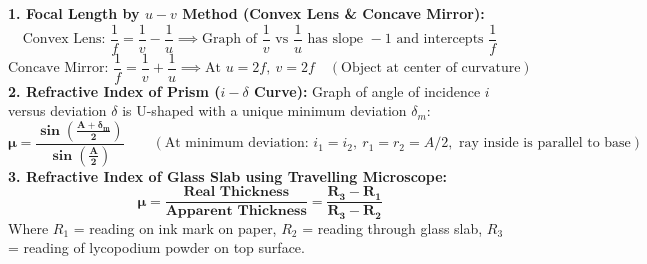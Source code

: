 \documentclass[10pt,a4paper]{article}
\begin{document}
\begin{formulabox}
\textbf{1. Focal Length by $u-v$ Method (Convex Lens \& Concave Mirror):}
\begin{equation}
  \text{Convex Lens: } \frac{1}{f} = \frac{1}{v} - \frac{1}{u} \implies \text{Graph of } \frac{1}{v} \text{ vs } \frac{1}{u} \text{ has slope } -1 \text{ and intercepts } \frac{1}{f}
\end{equation}
\begin{equation}
  \text{Concave Mirror: } \frac{1}{f} = \frac{1}{v} + \frac{1}{u} \implies \text{At } u = 2f, \ v = 2f \quad (\text{Object at center of curvature})
\end{equation}
\textbf{2. Refractive Index of Prism ($i-\delta$ Curve):}
Graph of angle of incidence $i$ versus deviation $\delta$ is U-shaped with a unique minimum deviation $\delta_m$:
\begin{equation}
  \mathbf{\mu = \frac{\sin\left(\frac{A + \delta_m}{2}\right)}{\sin\left(\frac{A}{2}\right)}} \qquad (\text{At minimum deviation: } i_1 = i_2, \ r_1 = r_2 = A/2, \text{ ray inside is parallel to base})
\end{equation}
\textbf{3. Refractive Index of Glass Slab using Travelling Microscope:}
\begin{equation}
  \mathbf{\mu = \frac{\text{Real Thickness}}{\text{Apparent Thickness}} = \frac{R_3 - R_1}{R_3 - R_2}}
\end{equation}
Where $R_1$ = reading on ink mark on paper, $R_2$ = reading through glass slab, $R_3$ = reading of lycopodium powder on top surface.
\end{formulabox}
\end{document}
